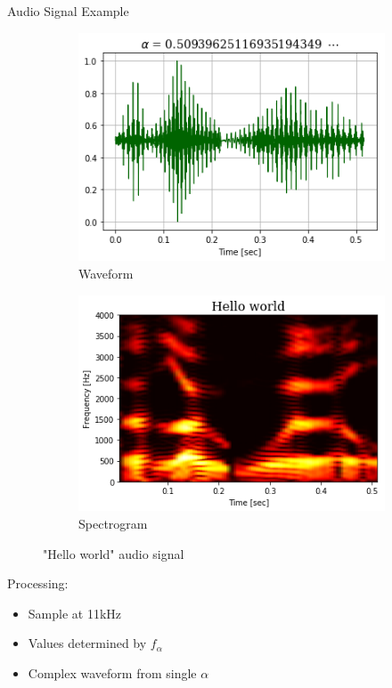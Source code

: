 \documentclass[10pt]{beamer}
\begin{document}
\begin{frame}{Audio Signal Example}
\begin{figure}
\begin{subfigure}{0.48\textwidth}
\includegraphics[width=\textwidth]{fig/note01/generated_waveform.png}
\caption{Waveform}
\end{subfigure}
\begin{subfigure}{0.48\textwidth}
\includegraphics[width=\textwidth]{fig/note01/generated_spectrogram.png}
\caption{Spectrogram}
\end{subfigure}
\caption{"Hello world" audio signal}
\end{figure}

Processing:
\begin{itemize}
\item Sample at 11kHz
\item Values determined by $f_\alpha$
\item Complex waveform from single $\alpha$
\end{itemize}
\end{frame}
\end{document}

